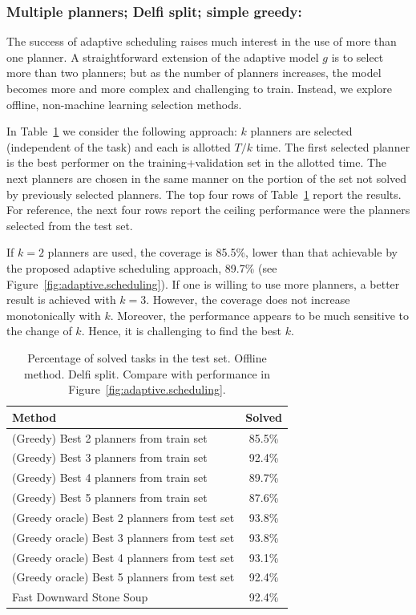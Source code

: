 \documentclass[letterpaper]{article} %
\begin{document}
\subsubsection{Multiple planners; Delfi split; simple greedy:} The success of adaptive scheduling raises much interest in the use of more than one planner. A straightforward extension of the adaptive model $g$ is to select more than two planners; but as the number of planners increases, the model becomes more and more complex and challenging to train. Instead, we explore offline, non-machine learning selection methods.

In Table~\ref{tab:offline.portfolio} we consider the following approach: $k$
planners are selected (independent of the task) and each is allotted $T/k$ time.
The first selected planner is the best performer on the training+validation set in the allotted time. The next planners are
chosen in the same manner on the portion of the set not solved by previously selected planners. The top four rows of
Table~\ref{tab:offline.portfolio} report the results. For reference, the next four rows
report the ceiling performance were the planners selected
from the test set.

If $k=2$ planners are used, the coverage is 85.5\%, lower than that
achievable by the proposed adaptive scheduling approach, 89.7\% (see
Figure~\ref{fig:adaptive.scheduling}). If one is willing to use more planners, a better result is achieved with $k=3$. However, the coverage does not increase
monotonically with $k$. Moreover, the performance appears to be much sensitive to the change of $k$. Hence, it is challenging to
find the best $k$.

\begin{table}[ht]
\centering
\caption{Percentage of solved tasks in the test set. Offline method. Delfi split. Compare with performance in Figure~\ref{fig:adaptive.scheduling}.}
\label{tab:offline.portfolio}
\begin{tabular}{lc}
\hline
Method & Solved \\
\hline
(Greedy) Best 2 planners from train set & 85.5\% \\
(Greedy) Best 3 planners from train set & 92.4\% \\
(Greedy) Best 4 planners from train set & 89.7\% \\
(Greedy) Best 5 planners from train set & 87.6\% \\
\hline
(Greedy oracle) Best 2 planners from test set & 93.8\% \\
(Greedy oracle) Best 3 planners from test set & 93.8\% \\
(Greedy oracle) Best 4 planners from test set & 93.1\% \\
(Greedy oracle) Best 5 planners from test set & 92.4\% \\
\hline
Fast Downward Stone Soup & 92.4\% \\
\hline
\end{tabular}
\end{table}
\end{document}
